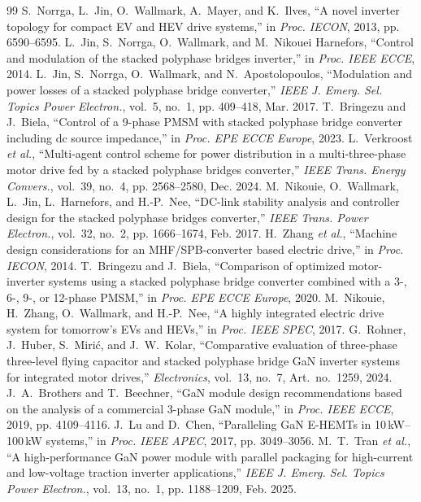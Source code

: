 \documentclass[conference]{IEEEtran}
\begin{document}
\begin{thebibliography}{99}
 S.~Norrga, L.~Jin, O.~Wallmark, A.~Mayer, and K.~Ilves, ``A novel inverter topology for compact EV and HEV drive systems,'' in \emph{Proc. IECON}, 2013, pp. 6590--6595.
 L.~Jin, S.~Norrga, O.~Wallmark, and M.~Nikouei Harnefors, ``Control and modulation of the stacked polyphase bridges inverter,'' in \emph{Proc. IEEE ECCE}, 2014.
 L.~Jin, S.~Norrga, O.~Wallmark, and N.~Apostolopoulos, ``Modulation and power losses of a stacked polyphase bridge converter,'' \emph{IEEE J. Emerg. Sel. Topics Power Electron.}, vol.~5, no.~1, pp. 409--418, Mar. 2017.
 T.~Bringezu and J.~Biela, ``Control of a 9-phase PMSM with stacked polyphase bridge converter including dc source impedance,'' in \emph{Proc. EPE ECCE Europe}, 2023.
 L.~Verkroost \emph{et al.}, ``Multi-agent control scheme for power distribution in a multi-three-phase motor drive fed by a stacked polyphase bridges converter,'' \emph{IEEE Trans. Energy Convers.}, vol.~39, no.~4, pp. 2568--2580, Dec. 2024.
 M.~Nikouie, O.~Wallmark, L.~Jin, L.~Harnefors, and H.-P.~Nee, ``DC-link stability analysis and controller design for the stacked polyphase bridges converter,'' \emph{IEEE Trans. Power Electron.}, vol.~32, no.~2, pp. 1666--1674, Feb. 2017.
 H.~Zhang \emph{et al.}, ``Machine design considerations for an MHF/SPB-converter based electric drive,'' in \emph{Proc. IECON}, 2014.
 T.~Bringezu and J.~Biela, ``Comparison of optimized motor-inverter systems using a stacked polyphase bridge converter combined with a 3-, 6-, 9-, or 12-phase PMSM,'' in \emph{Proc. EPE ECCE Europe}, 2020.
 M.~Nikouie, H.~Zhang, O.~Wallmark, and H.-P.~Nee, ``A highly integrated electric drive system for tomorrow's EVs and HEVs,'' in \emph{Proc. IEEE SPEC}, 2017.
 G.~Rohner, J.~Huber, S.~Miri\'c, and J.~W.~Kolar, ``Comparative evaluation of three-phase three-level flying capacitor and stacked polyphase bridge GaN inverter systems for integrated motor drives,'' \emph{Electronics}, vol.~13, no.~7, Art.~no.~1259, 2024.
 J.~A.~Brothers and T.~Beechner, ``GaN module design recommendations based on the analysis of a commercial 3-phase GaN module,'' in \emph{Proc. IEEE ECCE}, 2019, pp. 4109--4116.
 J.~Lu and D.~Chen, ``Paralleling GaN E-HEMTs in 10\,kW--100\,kW systems,'' in \emph{Proc. IEEE APEC}, 2017, pp. 3049--3056.
 M.~T.~Tran \emph{et al.}, ``A high-performance GaN power module with parallel packaging for high-current and low-voltage traction inverter applications,'' \emph{IEEE J. Emerg. Sel. Topics Power Electron.}, vol.~13, no.~1, pp. 1188--1209, Feb. 2025.

\end{thebibliography}
\end{document}
